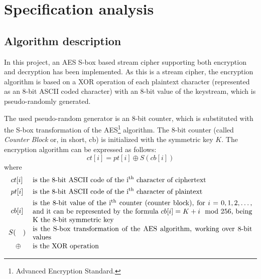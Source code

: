 \section{Specification analysis}

\subsection{Algorithm description}
In this project, an AES S-box based stream cipher supporting both encryption and decryption has been implemented. As this is a stream cipher, the encryption algorithm is based on a XOR operation of each plaintext character (represented as an 8-bit ASCII coded character) with an 8-bit value of the keystream, which is pseudo-randomly generated.

The used pseudo-random generator is an 8-bit counter, which is substituted with the S-box transformation of the AES\footnote{Advanced Encryption Standard.} algorithm. The 8-bit counter (called \textit{Counter Block} or, in short, cb) is initialized with the symmetric key $K$. The encryption algorithm can be expressed as follows:
\begin{equation}
    \label{eqn:enc}
    ct[i] = pt[i] \oplus S(cb[i])
\end{equation}
where
\begin{align*}
     & \  ct[i]     &  & \text{is the 8-bit ASCII code of the i\textsuperscript{th} character of ciphertext}                                                                                                                                \\
     & \  pt[i]     &  & \text{is the 8-bit ASCII code of the i\textsuperscript{th} character of plaintext}                                                                                                                                 \\
     & \ cb[i]      &  & \parbox{11cm}{is the 8-bit value of the i\textsuperscript{th} counter (counter block), for $i = 0,1,2, \dots$, and it can be represented by the formula $cb[i] = K + i \mod 256$, being K the 8-bit symmetric key} \\
     & S(\quad )    &  & \parbox{11cm}{is the S-box transformation of the AES algorithm, working over 8-bit values}                                                                                                                         \\
     & \ \ \ \oplus &  & \text{is the XOR operation}                                                                                                                                                                                        \\
\end{align*}

